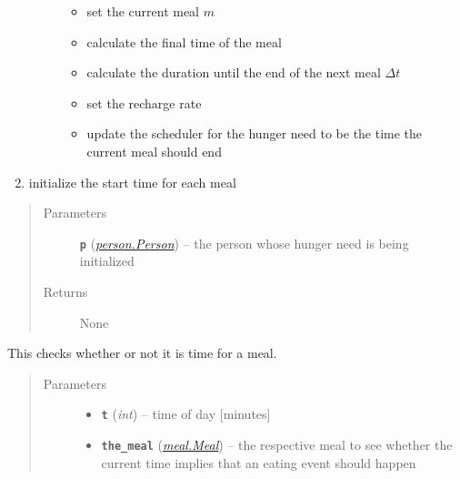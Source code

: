 \documentclass[letterpaper,10pt,english]{sphinxmanual}
\begin{document}
\begin{fulllineitems}
\begin{fulllineitems}
\begin{enumerate}
\begin{description}
\begin{itemize}
\item {} 
set the current meal \(m\)

\item {} 
calculate the final time of the meal

\item {} 
calculate the duration until the end of the next meal \(\Delta{t}\)

\item {} 
set the recharge rate

\item {} 
update the scheduler for the hunger need to be the time the current meal should end

\end{itemize}

\end{description}

\item {} 
initialize the start time for each meal

\end{enumerate}
\begin{quote}\begin{description}
\item[{Parameters}] \leavevmode
\textbf{\texttt{p}} ({\hyperref[person:person.Person]{\emph{\emph{person.Person}}}}) -- the person whose hunger need is being initialized

\item[{Returns}] \leavevmode
None

\end{description}\end{quote}

\end{fulllineitems}


\begin{fulllineitems}
\label{hunger:hunger.Hunger.is_meal_time}
This checks whether or not it is time for a meal.
\begin{quote}\begin{description}
\item[{Parameters}] \leavevmode\begin{itemize}
\item {} 
\textbf{\texttt{t}} (\emph{int}) -- time of day {[}minutes{]}

\item {} 
\textbf{\texttt{the\_meal}} ({\hyperref[meal:meal.Meal]{\emph{\emph{meal.Meal}}}}) -- the respective meal to see whether the current time implies                             that an eating event should happen


\end{itemize}
\end{description}
\end{quote}
\end{fulllineitems}
\end{fulllineitems}
\end{document}
